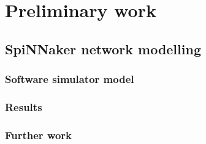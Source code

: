 \chapter{Preliminary work}
	
	
	\section{SpiNNaker network modelling}
		
		
		\subsection{Software simulator model}
			
		
		\subsection{Results}
			
		
		\subsection{Further work}
			
	
